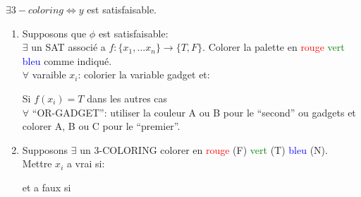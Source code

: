 \documentclass[a4paper,12pt]{article}
\begin{document}
    $\exists 3-coloring \Leftrightarrow y$ est satisfaisable.
    
    \begin{enumerate}
      \item Supposons que $\phi$ est satisfaisable: \\
	  $\exists$ un SAT associé a $f : \{x_1, ... x_n\} \rightarrow \{T, F\}$. Colorer la palette en \textcolor{red}{rouge} \textcolor{green}{vert} \textcolor{blue}{bleu} comme indiqué.\\
	  $\forall$ varaible $x_i$: colorier la variable gadget et:
	  Si $f(x_i) = T$ dans les autres cas\\
	  $\forall$ ``OR-GADGET'': utiliser la couleur A ou B pour le ``second'' ou gadgets et colorer A, B ou C pour le ``premier''.
      \item Supposons $\exists$ un 3-COLORING colorer en \textcolor{red}{rouge} (F) \textcolor{green}{vert} (T) \textcolor{blue}{bleu} (N).\\
	  Mettre $x_i$ a vrai si: 
	   et a faux si
    \end{enumerate}


  
\end{document}

